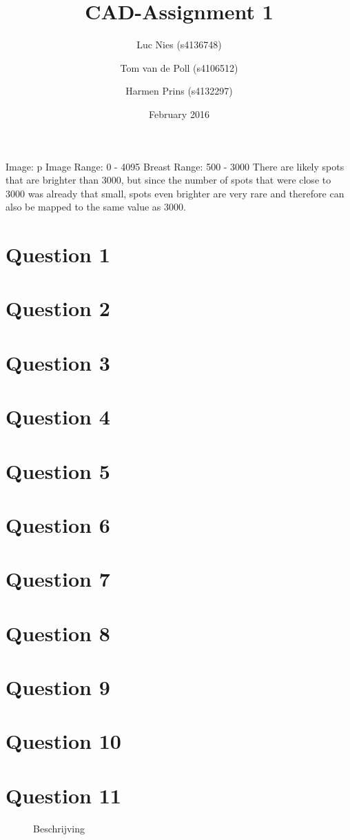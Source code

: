\documentclass{article}
\title{CAD-Assignment 1}
\author{Luc Nies (s4136748) \and Tom van de Poll (s4106512) \and Harmen Prins (s4132297)}
\date{February 2016}
\begin{document}
\maketitle

Image: p
Image Range: 0 - 4095
Breast Range: 500 - 3000
There are likely spots that are brighter than 3000, but since the number of spots that were close to 3000 was already that small, spots even brighter are very rare and therefore can also be mapped to the same value as 3000.

\section*{Question 1}

\section*{Question 2}

\section*{Question 3}

\section*{Question 4}
\section*{Question 5}
\section*{Question 6}
\section*{Question 7}
\section*{Question 8}
\section*{Question 9}
\section*{Question 10}
\section*{Question 11}



\begin{figure}[h]
    \centering
    \caption{Beschrijving}
\end{figure}

\begin{lstlisting}
\end{lstlisting}
\end{document}

